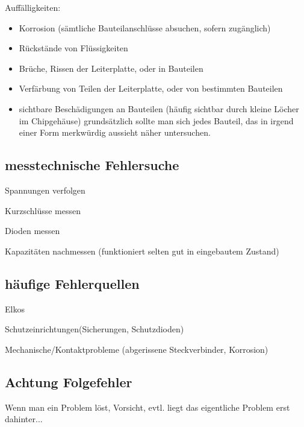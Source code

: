 Auffälligkeiten:
\begin{itemize}
	\item Korrosion (sämtliche Bauteilanschlüsse absuchen, sofern zugänglich)
	\item Rückstände von Flüssigkeiten
	\item Brüche, Rissen der Leiterplatte, oder in Bauteilen
	\item Verfärbung von Teilen der Leiterplatte, oder von bestimmten Bauteilen
	\item sichtbare Beschädigungen an Bauteilen (häufig sichtbar durch kleine Löcher im Chipgehäuse) grundsätzlich sollte man sich jedes Bauteil, das in irgend einer Form merkwürdig aussieht näher untersuchen.
\end{itemize}

\subsection{messtechnische Fehlersuche}

Spannungen verfolgen

Kurzschlüsse messen

Dioden messen

Kapazitäten nachmessen (funktioniert selten gut in eingebautem Zustand)

\subsection{häufige Fehlerquellen}

Elkos

Schutzeinrichtungen(Sicherungen, Schutzdioden)

Mechanische/Kontaktprobleme (abgerissene Steckverbinder, Korrosion)

\subsection{Achtung Folgefehler}

Wenn man ein Problem löst, Vorsicht, evtl. liegt das eigentliche Problem erst dahinter...